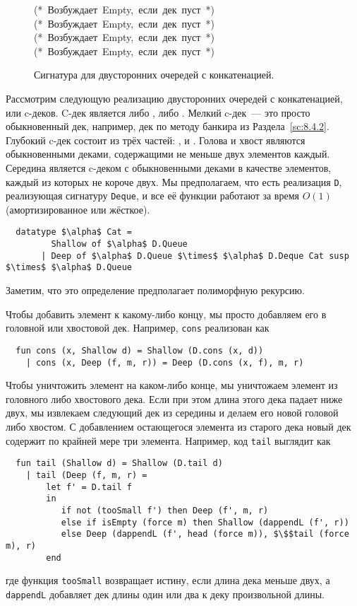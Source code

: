 \begin{figure}
  \centering

  (*\mbox{ Возбуждает }Empty\mbox{, если дек пуст }*)\\
  (*\mbox{ Возбуждает }Empty\mbox{, если дек пуст }*)\\
  (*\mbox{ Возбуждает }Empty\mbox{, если дек пуст }*)\\
  (*\mbox{ Возбуждает }Empty\mbox{, если дек пуст }*)\\

  \caption{Сигнатура для двусторонних очередей с конкатенацией.}
  \label{fig:11.2}
\end{figure}

Рассмотрим следующую реализацию двусторонних очередей с конкатенацией,
или c-деков. C-дек является либо , либо
. Мелкий c-дек~--- это просто обыкновенный дек,
например, дек по методу банкира из Раздела~\ref{sc:8.4.2}. Глубокий
c-дек состоит из трёх частей: ,
 и . Голова и хвост являются
обыкновенными деками, содержащими не меньше двух элементов
каждый. Середина является c-деком с обыкновенными деками в качестве
элементов, каждый из которых не короче двух. Мы предполагаем, что есть
реализация \lstinline!D!, реализующая сигнатуру \lstinline!Deque!, и
все её функции работают за время $O(1)$ (амортизированное или
жёсткое).
\begin{lstlisting}
  datatype $\alpha$ Cat =
         Shallow of $\alpha$ D.Queue
       | Deep of $\alpha$ D.Queue $\times$ $\alpha$ D.Deque Cat susp $\times$ $\alpha$ D.Queue
\end{lstlisting}
Заметим, что это определение предполагает полиморфную рекурсию.

Чтобы добавить элемент к какому-либо концу, мы просто добавляем его в
головной или хвостовой дек. Например, \lstinline!cons! реализован как
\begin{lstlisting}
  fun cons (x, Shallow d) = Shallow (D.cons (x, d))
    | cons (x, Deep (f, m, r)) = Deep (D.cons (x, f), m, r)
\end{lstlisting}
Чтобы уничтожить элемент на каком-либо конце, мы уничтожаем элемент из
головного либо хвостового дека. Если при этом длина этого дека падает
ниже двух, мы извлекаем следующий дек из середины и делаем его новой
головой либо хвостом. С добавлением остающегося элемента из старого
дека новый дек содержит по крайней мере три элемента. Например, код
\lstinline!tail! выглядит как
\begin{lstlisting}
  fun tail (Shallow d) = Shallow (D.tail d)
    | tail (Deep (f, m, r) =
        let f' = D.tail f
        in
           if not (tooSmall f') then Deep (f', m, r)
           else if isEmpty (force m) then Shallow (dappendL (f', r))
           else Deep (dappendL (f', head (force m)), $\$$tail (force m), r)
        end
\end{lstlisting}
где функция \lstinline!tooSmall! возвращает истину, если длина дека
меньше двух, а \lstinline!dappendL! добавляет дек длины один или два к
деку произвольной длины.


